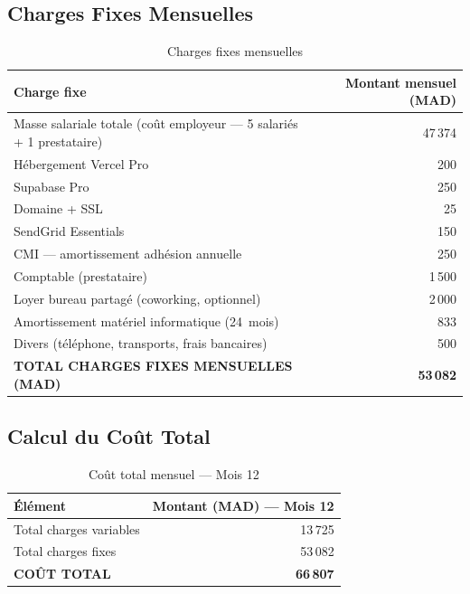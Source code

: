 \documentclass[12pt,a4paper,openany]{report}
\begin{document}
\subsection{Charges Fixes Mensuelles}

\begin{table}[H]
\centering
\small
\begin{tabular}{lr}
\toprule
\textbf{Charge fixe} & \textbf{Montant mensuel (MAD)} \\
\midrule
Masse salariale totale (coût employeur — 5 salariés + 1 prestataire) & 47\,374 \\
Hébergement Vercel Pro                              & 200 \\
Supabase Pro                                        & 250 \\
Domaine + SSL                                       & 25 \\
SendGrid Essentials                                 & 150 \\
CMI — amortissement adhésion annuelle               & 250 \\
Comptable (prestataire)                             & 1\,500 \\
Loyer bureau partagé (coworking, optionnel)         & 2\,000 \\
Amortissement matériel informatique (24~mois)       & 833 \\
Divers (téléphone, transports, frais bancaires)     & 500 \\
\midrule
\textbf{TOTAL CHARGES FIXES MENSUELLES (MAD)}       & \textbf{53\,082} \\
\bottomrule
\end{tabular}
\caption{Charges fixes mensuelles}
\label{tab:cf}
\end{table}

\subsection{Calcul du Coût Total}

\begin{table}[H]
\centering
\small
\begin{tabular}{lr}
\toprule
\textbf{Élément} & \textbf{Montant (MAD) — Mois 12} \\
\midrule
Total charges variables & 13\,725 \\
Total charges fixes     & 53\,082 \\
\midrule
\textbf{COÛT TOTAL}     & \textbf{66\,807} \\
\bottomrule
\end{tabular}
\caption{Coût total mensuel — Mois 12}
\label{tab:cout_total}
\end{table}
\end{document}
